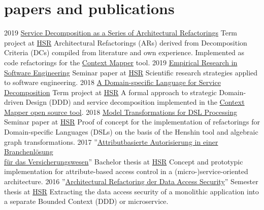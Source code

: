 \documentclass[]{cv-style}
\begin{document}
\section{papers and publications}

\begin{entrylist}
\entry
{2019}
{\href{https://stefan.kapferer.ch/2019/09/05/service-decomposition-as-a-series-of-architectural-refactorings/}{Service Decomposition as a Series of Architectural Refactorings}}
{Term project at \href{https://www.hsr.ch}{HSR}}
{Architectural Refactorings (ARs) derived from Decomposition Criteria (DCs) compiled from literature and own experience. Implemented as code refactorings for the \href{https://contextmapper.github.io/}{Context Mapper} tool.}
\entry
{2019}
{\href{https://github.com/stefan-ka/papers-and-publications/raw/master/empirical-research-in-software-engineering/FS19_SKapferer_Empirical-Research-in-Software-Engineering-Paper.pdf}{Empirical Research in Software Engineering}}
{Seminar paper at \href{https://www.hsr.ch}{HSR}}
{Scientific research strategies applied to software engineering.}
\entry
{2018}
{\href{https://eprints.hsr.ch/722/}{A Domain-specific Language for Service Decomposition}}
{Term project at \href{https://www.hsr.ch}{HSR}}
{A formal approach to strategic Domain-driven Design (DDD) and service decomposition implemented in the \href{https://contextmapper.github.io/}{Context Mapper open source tool}.}
\entry
{2018}
{\href{https://stefan.kapferer.ch/model-transformations-for-dsl-processing}{Model Transformations for DSL Processing}}
{Seminar paper at \href{https://www.hsr.ch}{HSR}}
{Proof of concept for the implementation of refactorings for Domain-specific Languages (DSLs) on the basis of the Henshin tool and algebraic graph transformations.}
\entry
{2017}
{''\href{https://eprints.hsr.ch/602/}{Attributbasierte Autorisierung in einer Branchenlösung\\für das Versicherungswesen}''}
{Bachelor thesis at \href{https://www.hsr.ch}{HSR}}
{Concept and prototypic implementation for attribute-based access control in a (micro-)service-oriented architecture.}
\entry
{2016}
{''\href{https://eprints.hsr.ch/564/}{Architectural Refactoring der Data Access Security}''}
{Semester thesis at \href{https://www.hsr.ch}{HSR}}
{Extracting the data access security of a monolithic application into a separate Bounded Context (DDD) or microservice.}
\end{entrylist}
\end{document}
